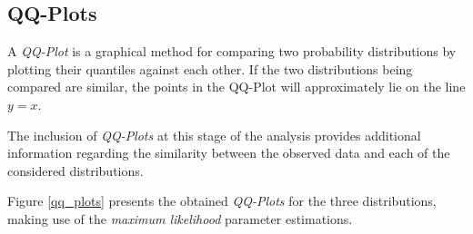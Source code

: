 \documentclass[12pt]{article}
\begin{document}
\subsection{QQ-Plots}

A \emph{QQ-Plot} is a graphical method for comparing two probability distributions by plotting their quantiles against each other. If the two distributions being compared are similar, the points in the QQ-Plot will approximately lie on the line $y=x$.

The inclusion of \emph{QQ-Plots} at this stage of the analysis provides additional information regarding the similarity between the observed data and each of the considered distributions.

Figure \ref{qq_plots} presents the obtained \emph{QQ-Plots} for the three distributions, making use of the \emph{maximum likelihood} parameter estimations.
\end{document}

